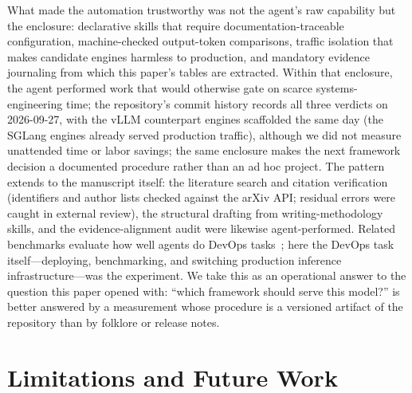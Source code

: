 \documentclass[11pt]{article}
\begin{document}
What made the automation trustworthy was not the agent's raw capability but the enclosure: declarative skills that require documentation-traceable configuration, machine-checked output-token comparisons, traffic isolation that makes candidate engines harmless to production, and mandatory evidence journaling from which this paper's tables are extracted. Within that enclosure, the agent performed work that would otherwise gate on scarce systems-engineering time; the repository's commit history records all three verdicts on 2026-09-27, with the vLLM counterpart engines scaffolded the same day (the SGLang engines already served production traffic), although we did not measure unattended time or labor savings; the same enclosure makes the next framework decision a documented procedure rather than an ad hoc project. The pattern extends to the manuscript itself: the literature search and citation verification (identifiers and author lists checked against the arXiv API; residual errors were caught in external review), the structural drafting from writing-methodology skills, and the evidence-alignment audit were likewise agent-performed. Related benchmarks evaluate how well agents do DevOps tasks~\cite{tang2026devopsgym}; here the DevOps task itself---deploying, benchmarking, and switching production inference infrastructure---was the experiment. We take this as an operational answer to the question this paper opened with: ``which framework should serve this model?'' is better answered by a measurement whose procedure is a versioned artifact of the repository than by folklore or release notes.

\section{Limitations and Future Work}
\end{document}
